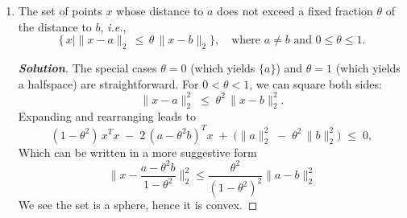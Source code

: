 \documentclass[12pt]{article}
\newenvironment{Solution}
  {\begin{proof}[\textbf{Solution}]}
  {\end{proof}}
\begin{document}
\begin{enumerate}[label=(\alph*)]
	\item
	      The set of points \(x\) whose distance to \(a\) does not exceed a fixed fraction \(\theta\) of the distance to \(b\), \emph{i.e.},
	      \[
		      \{\,x \mid \|x - a\|_2 \,\le\, \theta\,\|x - b\|_2\},
		      \quad
		      \text{where }a \neq b
		      \text{ and } 0 \le \theta \le 1.
	      \]
	      \begin{Solution}
		      The special cases \(\theta = 0\) (which yields \(\{a\}\)) and \(\theta = 1\) (which yields a halfspace) are straightforward. For \(0 < \theta < 1\), we can square both sides:
		      \[
			      \|x - a\|_2^2
			      \;\le\;
			      \theta^2 \,\|x - b\|_2^2.
		      \]
		      Expanding and rearranging leads to
		      \[
			      (1 - \theta^2)\,x^T x
			      \;-\;
			      2\,(a - \theta^2 b)^T x
			      \;+\;
			      \bigl(\|a\|_2^2 \;-\;\theta^2\,\|b\|_2^2\bigr)
			      \;\le\;
			      0,
		      \]
		      Which can be written in a more suggestive form
		      \[
			      \|x - \frac{a-\theta^2 b}{1-\theta^2} \|_2^2 \leq \frac{\theta^2}{(1-\theta^2)^2} \|a-b\|_2^2
		      \]
		      We see the set is a sphere, hence it is convex.
	      \end{Solution}
\end{enumerate}
\end{document}
